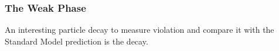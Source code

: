 

\subsubsection{The Weak Phase \phis}

An interesting particle decay to measure \CP violation and compare it with the Standard Model
prediction is the \BsJpsiPhi decay.
%
%
%

